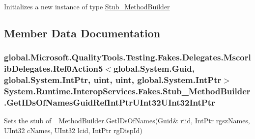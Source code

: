 Initializes a new instance of type \hyperlink{class_system_1_1_runtime_1_1_interop_services_1_1_fakes_1_1_stub___method_builder}{Stub\-\_\-\-Method\-Builder}



\subsection{Member Data Documentation}
\hypertarget{class_system_1_1_runtime_1_1_interop_services_1_1_fakes_1_1_stub___method_builder_a0658914f86252d5dd35463beaabf9ef0}{
\subsubsection[{Get\-I\-Ds\-Of\-Names\-Guid\-Ref\-Int\-Ptr\-U\-Int32\-U\-Int32\-Int\-Ptr}]{\setlength{\rightskip}{0pt plus 5cm}global.\-Microsoft.\-Quality\-Tools.\-Testing.\-Fakes.\-Delegates.\-Mscorlib\-Delegates.\-Ref0\-Action5$<$global.\-System.\-Guid, global.\-System.\-Int\-Ptr, uint, uint, global.\-System.\-Int\-Ptr$>$ System.\-Runtime.\-Interop\-Services.\-Fakes.\-Stub\-\_\-\-Method\-Builder.\-Get\-I\-Ds\-Of\-Names\-Guid\-Ref\-Int\-Ptr\-U\-Int32\-U\-Int32\-Int\-Ptr}}\label{class_system_1_1_runtime_1_1_interop_services_1_1_fakes_1_1_stub___method_builder_a0658914f86252d5dd35463beaabf9ef0}


Sets the stub of \-\_\-\-Method\-Builder.\-Get\-I\-Ds\-Of\-Names(Guid\& riid, Int\-Ptr rgsz\-Names, U\-Int32 c\-Names, U\-Int32 lcid, Int\-Ptr rg\-Disp\-Id)

